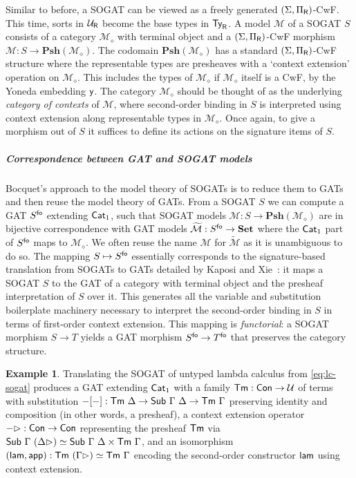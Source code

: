 \documentclass[10pt,a4paper]{article}
\theoremstyle{definition}
\newtheorem{example}[theorem]{Example}
\theoremstyle{remark}
\newcommand{\s}[1]{{\ensuremath{\textsf{\upshape #1}}}\xspace}
\newcommand{\cl}[1]{{\ensuremath{\mathcal{#1}}}\xspace}
\newcommand{\re}[1]{{\ensuremath{\mathbf{#1}}}\xspace}
\newcommand{\mth}[1]{\ensuremath{\textbf{\upshape #1}}\xspace}
\newcommand{\Set}{\mth{Set}}
\newcommand{\Psh}[1]{\ensuremath{\re{Psh}({#1})}\xspace}
\newcommand{\yoneda}{\s{y}}
\newcommand{\Con}{\s{Con}}
\newcommand{\Sub}{\s{Sub}}
\newcommand{\Ty}{\s{Ty}}
\newcommand{\Tm}{\s{Tm}}
\newcommand{\univ}{\cl{U}}
\newcommand{\lR}{_\s{R}}
\begin{document}
Similar to before, a SOGAT can be viewed as a freely generated $(\Sigma, \Pi_{\s
R})$-CwF. This time, sorts in $\univ\lR$ become the base types in $\Ty\lR$. A
model\label{def:sogat-model} $\cl M$ of a SOGAT $S$ consists of a category $\cl
M_\diamond$ with terminal object and a $(\Sigma, \Pi\lR)$-CwF morphism $\cl M :
S \to \Psh{\cl M_\diamond}$. The codomain $\Psh{\cl M_\diamond}$ has a standard
$(\Sigma, \Pi_{\s R})$-CwF structure where the representable types are presheaves
with a `context extension' operation on $\cl M_\diamond$. This includes the types of
$\cl M_{\diamond}$ if $\cl M_{\diamond}$ itself is a CwF, by the Yoneda embedding $\yoneda$. The category $\cl M_\diamond$
should be thought of as the underlying \emph{category of contexts} of $\cl M$, where
second-order binding in $S$ is interpreted using context extension along
representable types in $\cl M_\diamond$. Once again, to give a morphism out of $S$
it suffices to define its actions on the signature items of $S$.

\subparagraph{Correspondence between GAT and SOGAT models}

Bocquet's approach to the model theory of SOGATs is to reduce them to GATs and
then reuse the model theory of GATs. From a SOGAT $S$ we can compute a GAT
$S^{\s{fo}}$ extending $\s{Cat}_1$, such that SOGAT models $\cl M : S \to \Psh
{\cl M_{\diamond}}$ are in bijective correspondence with GAT models
$\widetilde{\cl M} : S^\s{fo} \to \Set$ where the $\s{Cat}_1$ part of $S^\s{fo}$
maps to $\cl M_{\diamond}$. We often reuse the name $\cl M$ for $\widetilde{\cl
M}$ as it is unambiguous to do so. The mapping $S \mapsto S^{\s{fo}}$
essentially corresponds to the signature-based translation from SOGATs to GATs
detailed by Kaposi and Xie~\cite{Kaposi2024-db}: it maps a SOGAT $S$ to the GAT
of a category with terminal object and the presheaf interpretation of $S$ over
it. This generates all the variable and substitution boilerplate machinery
necessary to interpret the second-order binding in $S$ in terms of first-order
context extension. This mapping is \emph{functorial}: a SOGAT morphism $S \to T$
yields a GAT morphism $S^{\s{fo}} \to T^{\s{fo}}$ that preserves the category
structure.

\begin{example}\label{ex:lc-fo} Translating the SOGAT of untyped lambda calculus
from \cref{eq:lc-sogat} produces a GAT extending $\s{Cat}_1$ with a family $\Tm
: \Con \to \univ$ of terms with substitution $-[-] : \Tm\ \Delta \to \Sub\
\Gamma\ \Delta \to \Tm\ \Gamma$ preserving identity and composition (in other
words, a presheaf), a context extension operator $-\rhd : \Con \to \Con$
representing the presheaf $\Tm$ via $\s{Sub}\ \Gamma\ (\Delta \rhd) \simeq
\s{Sub}\ \Gamma\ \Delta \times \Tm\ \Gamma$, and an isomorphism $(\s{lam},
\s{app}) : \Tm\ (\Gamma \rhd) \simeq \Tm\ \Gamma$ encoding the second-order
constructor $\s{lam}$ using context extension.
\end{example}
\end{document}
